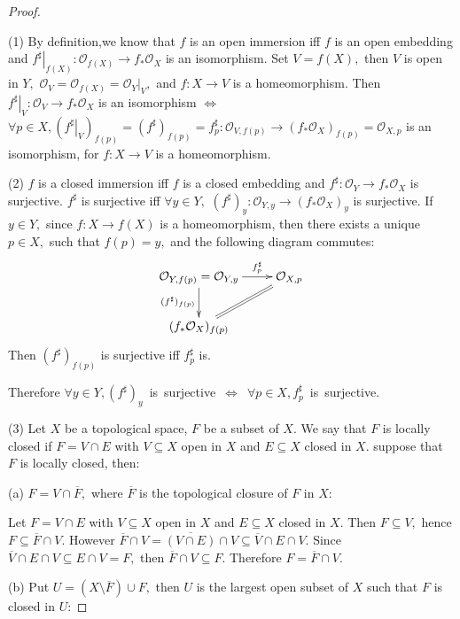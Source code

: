 \begin{proof}\
\enum
\item[(1)]By definition,we know that $f$ is an open immersion iff
$f$ is an open embedding and $\left.f^{\sharp}\right|_{f(X)}:
\mathcal {O}_{f(X)}\rightarrow f_{\ast}\mathcal {O}_X$ is an
isomorphism. Set $V=f(X),$ then $V$ is open in $Y,$ $\mathcal
{O}_V=\mathcal {O}_{f(X)}=\left.\mathcal {O}_Y\right|_V,$ and $f:
X\rightarrow V$ is a homeomorphism. Then $\left.f^{\sharp}\right|_V:
\mathcal {O}_V\rightarrow f_{\ast}\mathcal {O}_X$ is an isomorphism
$\Longleftrightarrow$ $\forall p \in X,
(\left.f^{\sharp}\right|_V)_{f(p)}=(f^{\sharp})_{f(p)}=f^{\sharp}_p:
\mathcal {O}_{V,f(p)}\rightarrow (f_{\ast}\mathcal
{O}_X)_{f(p)}=\mathcal {O}_{X,p}$ is an isomorphism, for $f:
X\rightarrow V$ is a homeomorphism.
\item[(2)]$f$ is a closed immersion iff $f$ is a closed embedding
and $f^{\sharp}: \mathcal {O}_Y\rightarrow f_{\ast}\mathcal {O}_X$
is surjective. $f^{\sharp}$ is surjective iff $\forall y\in Y,$
$(f^{\sharp})_y: \mathcal {O}_{Y,y}\rightarrow (f_{\ast}\mathcal
{O}_X)_y$ is surjective. If $y\in Y,$ since $f: X\rightarrow f(X)$
is a homeomorphism, then there exists a unique $p\in X,$ such that
$f(p)=y,$ and the following diagram commutes:
\[ \xymatrix{
   {\mathcal {O}_{Y,f(p)}=\mathcal {O}_{Y,y}}   \ar"1,2"^-{f^{\sharp}_p}
   \ar"2,1"_{(f^{\sharp})_{f(p)}}  & {\mathcal {O}_{X,p}}    \\
   {(f_{\ast}\mathcal {O}_X)_{f(p)}} \ar@{=}"1,2"} \]
Then $(f^{\sharp})_{f(p)}$ is surjective iff $f^{\sharp}_p$ is.

Therefore \mbox{$\forall y\in Y, (f^{\sharp})_y$ is surjective
$\Longleftrightarrow$ $\forall p\in X, f^{\sharp}_p$ is surjective}.
\item[(3)]Let $X$ be a topological space, $F$ be a subset of $X.$ We
say that $F$ is locally closed if $F=V\cap E$ with $V\subseteq X$
open in $X$ and $E\subseteq X$ closed in $X.$ suppose that $F$ is
locally closed, then:
\enum
\item[(a)] $F=V\cap \overline{F},$ where $\overline{F}$ is the
topological closure of $F$ in $X$:

Let $F=V\cap E$ with $V\subseteq X$ open in $X$ and $E\subseteq X$
closed in $X.$ Then $F\subseteq V,$ hence $F\subseteq
\overline{F}\cap V.$ However $\overline{F}\cap V=\overline{(V\cap
E)}\cap V\subseteq \overline{V}\cap E\cap V.$ Since
$\overline{V}\cap E\cap V\subseteq E\cap V=F,$ then
$\overline{F}\cap V\subseteq F.$ Therefore $F=\overline{F}\cap V.$
\item[(b)] Put $U=(X\setminus \overline{F})\cup F,$ then $U$ is the
largest open subset of $X$ such that $F$ is closed in $U$:


\end{proof}
